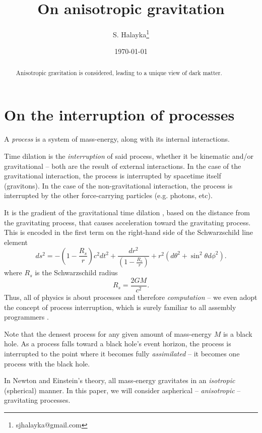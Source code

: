 \documentclass[12pt]{article}
\title{On anisotropic gravitation}
\author{S. Halayka\footnote{sjhalayka@gmail.com}}
\date{\today}
\begin{document}
 
\maketitle

\begin{abstract}
Anisotropic gravitation is considered, leading to a unique view of dark matter.
\end{abstract}






\section{On the interruption of processes}

A {\textit{process}} is a system of mass-energy, along with its internal interactions.

Time dilation is the {\textit{interruption}} of said process, whether it be kinematic and/or gravitational -- both are the result of external interactions.
In the case of the gravitational interaction, the process is interrupted by spacetime itself (gravitons).
In the case of the non-gravitational interaction, the process is interrupted by the other force-carrying particles (e.g. photons, etc).

It is the gradient of the gravitational time dilation \cite{misner}, based on the distance from the gravitating process, that causes acceleration toward the gravitating process.
This is encoded in the first term on the right-hand side of the Schwarzschild line element
\begin{equation}
ds^2 = -\left( 1 - \frac{R_s}{r} \right) c^2 dt^2 + \frac{dr^2}{\left( 1 - \frac{R_s}{r} \right)} + r^2 (d\theta^2 + \sin^2 \theta d\phi^2).
\end{equation}
where $R_s$ is the Schwarzschild radius
\begin{equation}
R_s = \frac{2GM}{c^2}.
\end{equation}
Thus, all of physics is about processes and therefore {\textit{computation}} -- we even adopt the concept of process interruption, which is surely familiar to all assembly programmers \cite{abrash}.

Note that the densest process for any given amount of mass-energy $M$ is a black hole.
As a process falls toward a black hole's event horizon, the process is interrupted to the point where it becomes fully {\textit{assimilated}} -- it becomes one process with the black hole.

In Newton and Einstein's theory, all mass-energy gravitates in an {\textit{isotropic}} (spherical) manner.
In this paper, we will consider aspherical -- {\textit{anisotropic}} -- gravitating processes.
\end{document}
